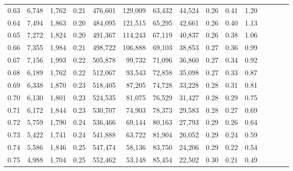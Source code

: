 \begin{tabular}{rrrcrrrrrrrrrrr}
0.63 &   6,748 &  1,762 &                                       0.21 &  476,601 &  129,009 &   63,432 &   44,524 &  0.26 &  0.41 &                         1.20 \\
0.64 &   7,494 &  1,863 &                                       0.20 &  484,095 &  121,515 &   65,295 &   42,661 &  0.26 &  0.40 &                         1.13 \\
0.65 &   7,272 &  1,824 &                                       0.20 &  491,367 &  114,243 &   67,119 &   40,837 &  0.26 &  0.38 &                         1.06 \\
0.66 &   7,355 &  1,984 &                                       0.21 &  498,722 &  106,888 &   69,103 &   38,853 &  0.27 &  0.36 &                         0.99 \\
0.67 &   7,156 &  1,993 &                                       0.22 &  505,878 &   99,732 &   71,096 &   36,860 &  0.27 &  0.34 &                         0.92 \\
0.68 &   6,189 &  1,762 &                                       0.22 &  512,067 &   93,543 &   72,858 &   35,098 &  0.27 &  0.33 &                         0.87 \\
0.69 &   6,338 &  1,870 &                                       0.23 &  518,405 &   87,205 &   74,728 &   33,228 &  0.28 &  0.31 &                         0.81 \\
0.70 &   6,130 &  1,801 &                                       0.23 &  524,535 &   81,075 &   76,529 &   31,427 &  0.28 &  0.29 &                         0.75 \\
0.71 &   6,172 &  1,844 &                                       0.23 &  530,707 &   74,903 &   78,373 &   29,583 &  0.28 &  0.27 &                         0.69 \\
0.72 &   5,759 &  1,790 &                                       0.24 &  536,466 &   69,144 &   80,163 &   27,793 &  0.29 &  0.26 &                         0.64 \\
0.73 &   5,422 &  1,741 &                                       0.24 &  541,888 &   63,722 &   81,904 &   26,052 &  0.29 &  0.24 &                         0.59 \\
0.74 &   5,586 &  1,846 &                                       0.25 &  547,474 &   58,136 &   83,750 &   24,206 &  0.29 &  0.22 &                         0.54 \\
0.75 &   4,988 &  1,704 &                                       0.25 &  552,462 &   53,148 &   85,454 &   22,502 &  0.30 &  0.21 &                         0.49 \\

\end{tabular}
